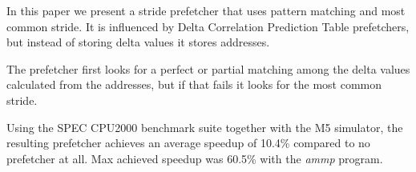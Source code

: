 In this paper we present a stride prefetcher that uses pattern matching and
most common stride. It is influenced by Delta Correlation Prediction Table
prefetchers, but instead of storing delta values it stores addresses.

The prefetcher first looks for a perfect or partial matching among the delta
values calculated from the addresses, but if that fails it looks for the most
common stride.

Using the SPEC CPU2000 benchmark suite together with the M5 simulator, the
resulting prefetcher achieves an average speedup of 10.4\% compared to no
prefetcher at all. Max achieved speedup was 60.5\% with the \emph{ammp} program.
